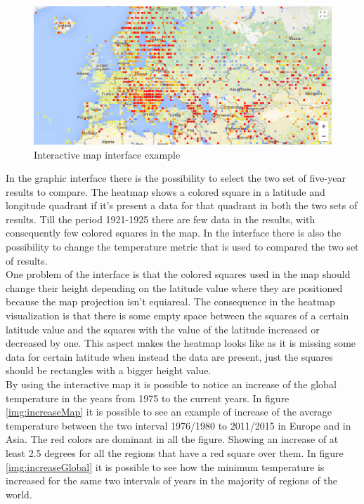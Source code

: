 \documentclass{vldb}
\begin{document}
\begin{figure}[tbh]
\includegraphics[width=1\linewidth]{interface}
\caption{Interactive map interface example}
\label{fig:interface}
\end{figure}

In the graphic interface there is the possibility to select the two set of five-year results to compare. The heatmap shows a colored square in a latitude and longitude quadrant if it's present a data for that quadrant in both the two sets of results. Till the period 1921-1925 there are few data in the results, with consequently few colored squares in the map. In the interface there is also the possibility to change the temperature metric that is used to compared the two set of results.\\
One problem of the interface is that the colored squares used in the map should change their height depending on the latitude value where they are positioned because the map projection isn't equiareal. The consequence in the heatmap visualization is that there is some empty space between the squares of a certain latitude value and the squares with the value of the latitude increased or decreased by one. This aspect makes the heatmap looks like as it is missing some data for certain latitude when instead the data are present, just the squares should be rectangles with a bigger height value.\\

By using the interactive map it is possible to notice an increase of the global temperature in the years from 1975 to the current years. In figure \ref{img:increaseMap} it is possible to see an example of increase of the average temperature between the two interval 1976/1980 to 2011/2015 in Europe and in Asia. The red colors are dominant in all the figure. Showing an increase of at least 2.5 degrees for all the regions that have a red square over them.
In figure \ref{img:increaseGlobal} it is possible to see how the minimum temperature is increased for the same two intervals of years in the majority of regions of the world.
\end{document}
